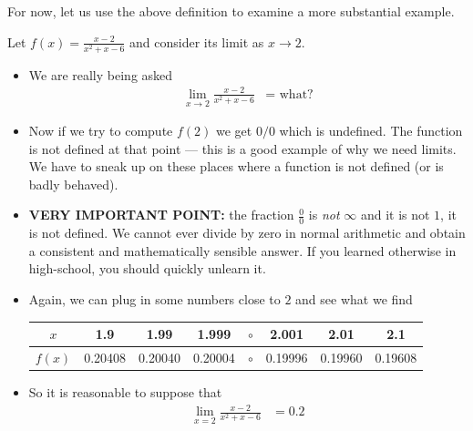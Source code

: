 For now, let us use the above definition to examine a more substantial
example.
\begin{eg}
Let $f(x) = \frac{x-2}{x^2+x-6}$ and consider its limit as $x \to 2$.


\begin{itemize}
 \item We are really being asked
  \begin{align*}
    \lim_{x \to 2} \frac{x-2}{x^2+x-6} &= \text{ what?}
  \end{align*}
  \item Now if we try to compute $f(2)$ we get $0/0$ which is
undefined. The function is not defined at that point --- this is a good example
of why we need limits.  We have to sneak up on these places where a function is
not defined (or is badly behaved).

 \item \textbf{VERY IMPORTANT POINT:} the fraction $\frac{0}{0}$ is
\emph{not} $\infty$ and it is not $1$, it is not defined. We cannot ever divide
by zero in normal arithmetic and obtain a consistent and mathematically
sensible answer. If you learned otherwise in high-school, you should quickly
unlearn it.

\item Again, we can plug in some numbers close to $2$ and see what we find
\begin{center}
 \begin{tabular}{|c||c|c|c|c|c|c|c|}
  \hline
  $x$ & 1.9 & 1.99 & 1.999 & $\circ$ & 2.001 & 2.01 & 2.1 \\
  \hline
  $f(x)$ & 0.20408 & 0.20040 &0.20004
  & $\circ$ & 0.19996 & 0.19960 & 0.19608 \\
\hline
\end{tabular}
\end{center}
\item So it is reasonable to suppose that
\begin{align*}
 \lim_{x=2} \frac{x-2}{x^2+x-6} &= 0.2
\end{align*}
\end{itemize}

\end{eg}

